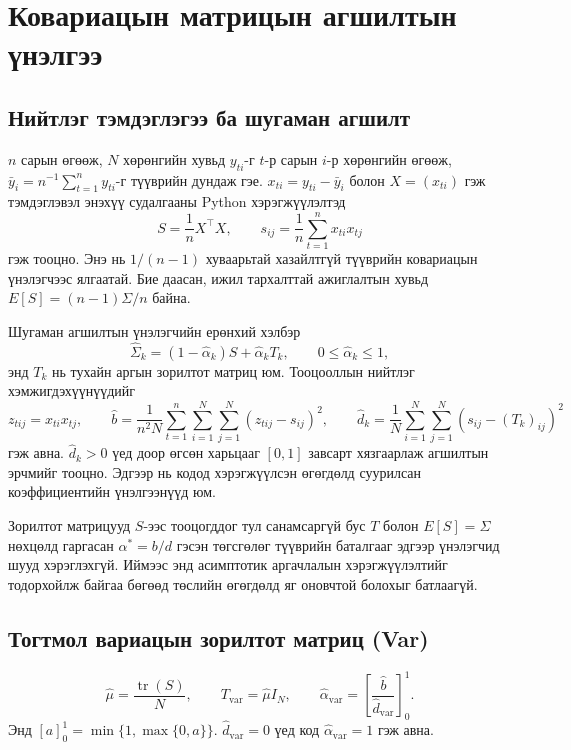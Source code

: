 
\section{Ковариацын матрицын агшилтын үнэлгээ}

\subsection{Нийтлэг тэмдэглэгээ ба шугаман агшилт}
$n$ сарын өгөөж, $N$ хөрөнгийн хувьд $y_{ti}$-г $t$-р сарын
$i$-р хөрөнгийн өгөөж, $\bar y_i=n^{-1}\sum_{t=1}^n y_{ti}$-г
түүврийн дундаж гэе. $x_{ti}=y_{ti}-\bar y_i$ болон
$X=(x_{ti})$ гэж тэмдэглэвэл энэхүү судалгааны Python
хэрэгжүүлэлтэд
\[
 S=\frac{1}{n}X^\top X,\qquad
 s_{ij}=\frac{1}{n}\sum_{t=1}^n x_{ti}x_{tj}
\]
гэж тооцно. Энэ нь $1/(n-1)$ хуваарьтай хазайлтгүй
түүврийн ковариацын үнэлэгчээс ялгаатай. Бие даасан, ижил
тархалттай ажиглалтын хувьд $E[S]=(n-1)\Sigma/n$ байна.

Шугаман агшилтын үнэлэгчийн ерөнхий хэлбэр
\[
 \widehat\Sigma_k=(1-\widehat\alpha_k)S+
 \widehat\alpha_k T_k,\qquad 0\le\widehat\alpha_k\le1,
\]
энд $T_k$ нь тухайн аргын зорилтот матриц юм.
Тооцооллын нийтлэг хэмжигдэхүүнүүдийг
\[
 z_{tij}=x_{ti}x_{tj},\qquad
 \widehat b=\frac{1}{n^2N}\sum_{t=1}^n\sum_{i=1}^N
 \sum_{j=1}^N(z_{tij}-s_{ij})^2,
 \qquad
 \widehat d_k=\frac1N\sum_{i=1}^N\sum_{j=1}^N
 (s_{ij}-(T_k)_{ij})^2
\]
гэж авна. $\widehat d_k>0$ үед доор өгсөн харьцааг
$[0,1]$ завсарт хязгаарлаж агшилтын эрчмийг тооцно.
Эдгээр нь кодод хэрэгжүүлсэн өгөгдөлд суурилсан
коэффициентийн үнэлгээнүүд юм.

Зорилтот матрицууд $S$-ээс тооцогддог тул санамсаргүй
бус $T$ болон $E[S]=\Sigma$ нөхцөлд гаргасан
$\alpha^*=b/d$ гэсэн төгсгөлөг түүврийн баталгааг эдгээр
үнэлэгчид шууд хэрэглэхгүй. Иймээс энд асимптотик
аргачлалын хэрэгжүүлэлтийг тодорхойлж байгаа бөгөөд
төслийн өгөгдөлд яг оновчтой болохыг батлаагүй.

\subsection{Тогтмол вариацын зорилтот матриц (Var)}
\[
 \widehat\mu=\frac{\operatorname{tr}(S)}{N},\qquad
 T_{\mathrm{var}}=\widehat\mu I_N,\qquad
 \widehat\alpha_{\mathrm{var}}=
 \left[\frac{\widehat b}{\widehat d_{\mathrm{var}}}\right]_0^1.
\]
Энд $[a]_0^1=\min\{1,\max\{0,a\}\}$.
$\widehat d_{\mathrm{var}}=0$ үед код
$\widehat\alpha_{\mathrm{var}}=1$ гэж авна.

